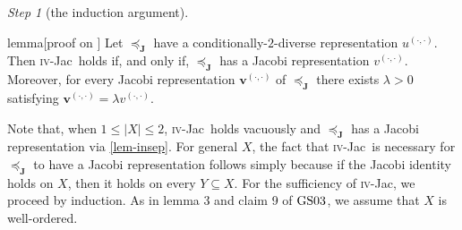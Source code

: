 \documentclass[ecta,nameyear,draft]{econsocart}
\newcommand{\mbbj}{\mathbf J}
\newcommand{\dd}{{(\cdot,\cdot)}}
\newcommand{\fourjac}{\textup{\textsc{iv}-Jac}}
\newcommand{\gsii}{$\textup{GS03}$}
\theoremstyle{plain}
\theoremstyle{remark}
\newtheorem{step}{Step}[section]
\begin{document}
\begin{appendix}
\begin{step}[the induction argument]
    \begin{theoremEnd}{lemma}[proof on
      ]\label{lem-induction} Let
      $\preceq_{\mbbj}$ have a conditionally-$2$-diverse representation
      $u^{\dd}$. Then \fourjac\ holds if, and only if, $\preceq_{\mbbj}$ has a
      Jacobi representation $v^{\dd}$.  Moreover, for every Jacobi
      representation $\mathbf v^{\dd}$ of $\preceq_{\mbbj}$ there exists
      $\lambda > 0$ satisfying $\mathbf v^{(\cdot, \cdot)} = \lambda v^{(\cdot,
      \cdot)}$.
    \end{theoremEnd}

  \begin{proofEnd}\label{proof-lem-induction}%
    Note that, when $1 \leq \lvert X \rvert \leq 2$, \fourjac\ holds vacuously
    and $\preceq_{\mbbj}$ has a Jacobi representation via \cref{lem-insep}. For
    general $X$, the fact that \fourjac\ is necessary for $\preceq_{\mbbj}$ to
    have a Jacobi representation follows simply because if the Jacobi identity
    holds on $X$, then it holds on every $Y\subseteq X$. For the sufficiency of
    \fourjac, we proceed by induction.  As in lemma 3 and claim 9 of \gsii, we
    assume that $X$ is well-ordered.  
  

\end{proofEnd}
\end{step}
\end{appendix}
\end{document}
